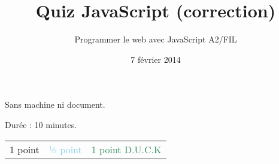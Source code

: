 \documentclass[a4paper, 12pt]{article}
\title{Quiz JavaScript (correction)}
\author{Programmer le web avec JavaScript A2/FIL}
\date{7 février 2014}
\newcommand{\fullpoint}[1]{\textcolor{RubineRed}{#1}}
\newcommand{\halfpoint}[1]{\textcolor{SkyBlue}{#1}}
\newcommand{\jedipoint}[1]{\textcolor{SeaGreen}{#1}}
\begin{document}
\maketitle



Sans machine ni document.

Durée : 10 minutes.


\begin{center}
\begin{tabular}{lll}
 \fullpoint{1 point}  &  \halfpoint{½ point}  &  \jedipoint{1 point D.U.C.K}  \\
\end{tabular}
\end{center}
\end{document}
